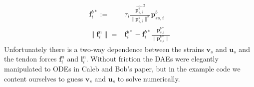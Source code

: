 \documentclass[12pt]{article}
\begin{document}
\begin{align*}
\boldsymbol{f}^{b*}_i :=& \tau_{i} \frac{\widehat{\boldsymbol{p}^{b}_{s,i}}^{2}}{\| \boldsymbol{p}^{b}_{s,i} \|^{3}} \boldsymbol{p}^b_{ss,i} \\
\| \boldsymbol{f}^n_i \| =& \boldsymbol{f}^{b*}_i - \boldsymbol{f}^{b*}_i \frac{\boldsymbol{p}^{b*}_{s,i}}{\| \boldsymbol{p}^{b*}_{s,i} \|}
\end{align*}
Unfortunately there is a two-way dependence between the strains $\boldsymbol{v}_s$ and $\boldsymbol{u}_s$ and the tendon forces $\boldsymbol{f}^n_i$ and $\boldsymbol{l}^n_i$. Without friction the DAEs were elegantly manipulated to ODEs in Caleb and Bob's paper, but in the example code we content ourselves to guess $\boldsymbol{v}_s$ and $\boldsymbol{u}_s$ to solve numerically.
\end{document}
